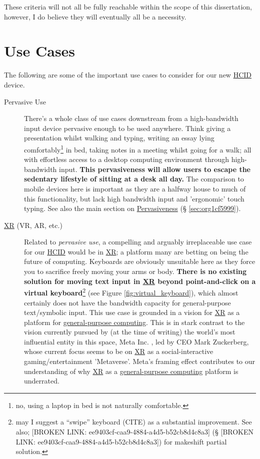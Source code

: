 \documentclass[logo,bsc,singlespacing,parskip]{infthesis}
\begin{document}
These criteria will not all be fully reachable within the scope of this dissertation, however, I do believe they will eventually all be a necessity.

\chapter{Use Cases}
\label{sec:org2d37584}
The following are some of the important use cases to consider for our new \hyperref[org0c83164]{HCID} device.

\begin{description}
\item[{Pervasive Use}] There's a whole class of use cases downstream from a high-bandwidth input device pervasive enough to be used anywhere.
Think giving a presentation whilst walking and typing, writing an essay lying comfortably\footnote{no, using a laptop in bed is not naturally comfortable.} in bed, taking notes in a meeting whilst going for a walk; all with effortless access to a desktop computing environment through high-bandwidth input.
\textbf{This pervasiveness will allow users to escape the sedentary lifestyle of sitting at a desk all day.}
The comparison to mobile devices here is important as they are a halfway house to much of this functionality, but lack high bandwidth input and 'ergonomic' touch typing.
See also the main section on \hyperref[sec:org1cf5999]{Pervasiveness} (§ \ref{sec:org1cf5999}).

\item[{\hyperref[org39cbd51]{XR} (VR, AR, etc.)}] Related to \emph{pervasive use}, a compelling and arguably irreplaceable use case for our \hyperref[org0c83164]{HCID} would be in \hyperref[org39cbd51]{XR}; a platform many are betting on being the future of computing.
Keyboards are obviously unsuitable here as they force you to sacrifice freely moving your arms or body.
\textbf{There is no existing solution for moving text input in \hyperref[org39cbd51]{XR} beyond point-and-click on a virtual keyboard}\footnote{may I suggest a ``swipe'' keyboard (CITE) as a substantial improvement. See also; [BROKEN LINK: ee9403cf-caa9-4884-a4d5-b52cb8d4c8a3] (§ [BROKEN LINK: ee9403cf-caa9-4884-a4d5-b52cb8d4c8a3]) for makeshift partial solution.} (see Figure \ref{fig:virtual_keyboard}), which almost certainly does not have the bandwidth capacity for general-purpose text/symbolic input.
This use case is grounded in a vision for \hyperref[org39cbd51]{XR} as a platform for \hyperref[orgbaec896]{general-purpose computing}.
This is in stark contrast to the vision currently pursued by (at the time of writing) the world's most influential entity in this space, Meta Inc. \autocite{WelcomeMetaMeta}, led by CEO Mark Zuckerberg, whose current focus seems to be on \hyperref[org39cbd51]{XR} as a social-interactive gaming/entertainment 'Metaverse'.
Meta's framing effect contributes to our understanding of why \hyperref[org39cbd51]{XR} as a \hyperref[orgbaec896]{general-purpose computing} platform is underrated.


\end{description}
\end{document}
